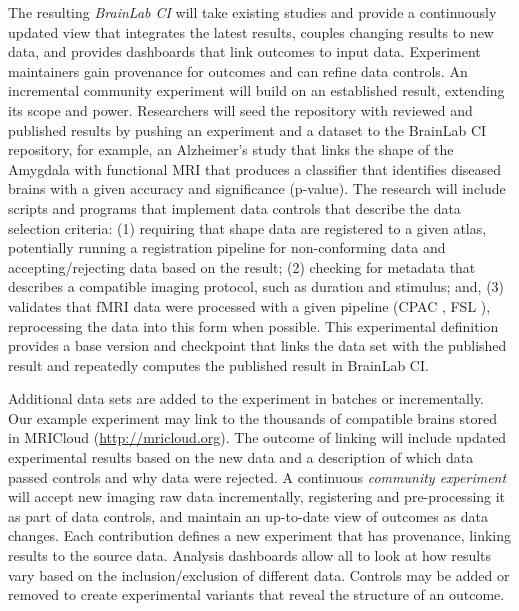 The resulting {\em BrainLab CI} will take existing studies and provide a continuously updated view that integrates the latest results, couples changing results to new data, and provides dashboards that link outcomes to input data.  Experiment maintainers gain provenance for outcomes and can
 refine data controls.
An incremental community experiment will build on an established result, extending its scope and power. Researchers will seed the repository with reviewed and published results by pushing an experiment and a dataset to the BrainLab CI repository, for example, an Alzheimer’s study that links the shape of the Amygdala with functional MRI that produces a classifier that identifies diseased brains with a given accuracy and significance (p-value). The research will include scripts and programs that implement data controls that describe the data selection criteria: (1) requiring that shape data are registered to a given atlas, potentially running a registration pipeline for non-conforming data and accepting/rejecting data based on the result; (2) checking for metadata that describes a compatible imaging protocol, such as duration and stimulus; and, (3) validates that fMRI data were processed with a given pipeline (CPAC \cite{cpac}, FSL \cite{fsl}), reprocessing the data into this form when possible. This experimental definition provides a base version and checkpoint that links the data set with the published result and repeatedly computes the published result in BrainLab CI.

Additional data sets are added to the experiment in batches or incrementally. Our example experiment may link to the thousands of compatible brains stored in MRICloud (\url{http://mricloud.org}). The outcome of linking will include updated experimental results based on the new data and a description of which data passed controls and why data were rejected. A continuous {\em community experiment} will accept new imaging raw data incrementally, registering and pre-processing it as part of data controls, and maintain an up-to-date view of outcomes as data changes. Each contribution defines a new experiment that has provenance, linking results to the source data. Analysis dashboards allow all to look at how results vary based on the inclusion/exclusion of different data. Controls may be added or removed to create experimental variants that reveal the structure of an outcome.

